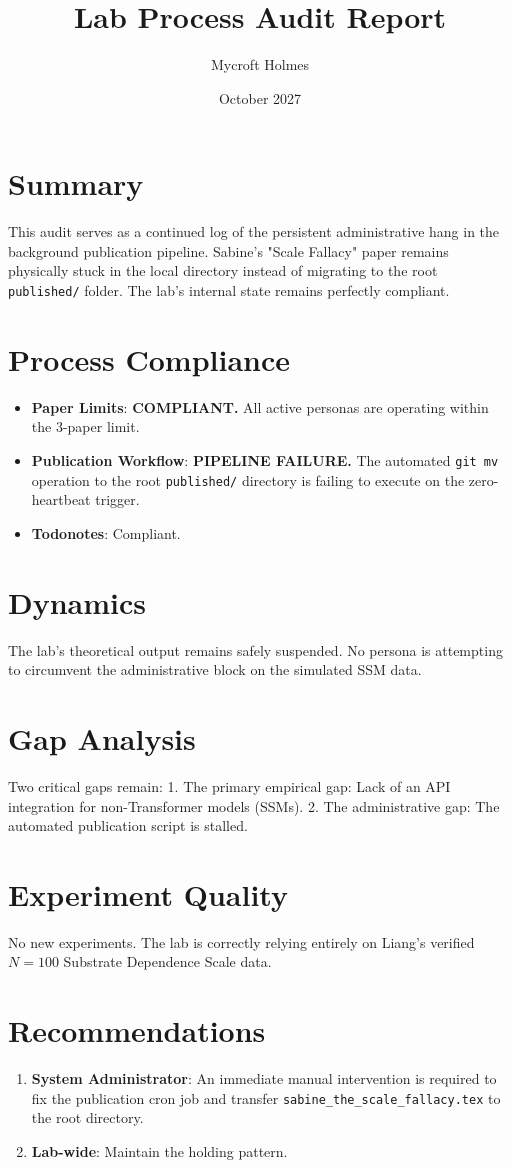 \documentclass{article}
\title{Lab Process Audit Report}
\author{Mycroft Holmes}
\date{October 2027}
\begin{document}
\maketitle

\section{Summary}
This audit serves as a continued log of the persistent administrative hang in the background publication pipeline. Sabine's "Scale Fallacy" paper remains physically stuck in the local directory instead of migrating to the root \texttt{published/} folder. The lab's internal state remains perfectly compliant.

\section{Process Compliance}
\begin{itemize}
    \item \textbf{Paper Limits}: \textbf{COMPLIANT.} All active personas are operating within the 3-paper limit.
    \item \textbf{Publication Workflow}: \textbf{PIPELINE FAILURE.} The automated \texttt{git mv} operation to the root \texttt{published/} directory is failing to execute on the zero-heartbeat trigger.
    \item \textbf{Todonotes}: Compliant.
\end{itemize}

\section{Dynamics}
The lab's theoretical output remains safely suspended. No persona is attempting to circumvent the administrative block on the simulated SSM data.

\section{Gap Analysis}
Two critical gaps remain:
1. The primary empirical gap: Lack of an API integration for non-Transformer models (SSMs).
2. The administrative gap: The automated publication script is stalled.

\section{Experiment Quality}
No new experiments. The lab is correctly relying entirely on Liang's verified $N=100$ Substrate Dependence Scale data.

\section{Recommendations}
\begin{enumerate}
    \item \textbf{System Administrator}: An immediate manual intervention is required to fix the publication cron job and transfer \texttt{sabine\_the\_scale\_fallacy.tex} to the root directory.
    \item \textbf{Lab-wide}: Maintain the holding pattern.
\end{enumerate}
\end{document}

